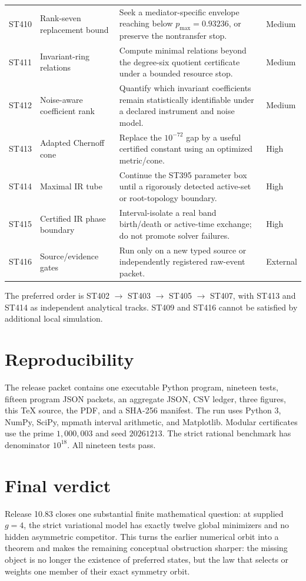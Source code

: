 \documentclass[11pt,a4paper]{article}
\begin{document}
\begin{longtable}{>{\raggedright\arraybackslash}p{}>{\raggedright\arraybackslash}p{}>{\raggedright\arraybackslash}p{}>{\raggedright\arraybackslash}p{}}
ST410&Rank-seven replacement bound&Seek a mediator-specific envelope reaching below $p_{\max}=0.93236$, or preserve the nontransfer stop.&Medium\\
ST411&Invariant-ring relations&Compute minimal relations beyond the degree-six quotient certificate under a bounded resource stop.&Medium\\
ST412&Noise-aware coefficient rank&Quantify which invariant coefficients remain statistically identifiable under a declared instrument and noise model.&Medium\\
ST413&Adapted Chernoff cone&Replace the $10^{-72}$ gap by a useful certified constant using an optimized metric/cone.&High\\
ST414&Maximal IR tube&Continue the ST395 parameter box until a rigorously detected active-set or root-topology boundary.&High\\
ST415&Certified IR phase boundary&Interval-isolate a real band birth/death or active-time exchange; do not promote solver failures.&High\\
ST416&Source/evidence gates&Run only on a new typed source or independently registered raw-event packet.&External\\
\bottomrule
\end{longtable}

The preferred order is ST402 $\to$ ST403 $\to$ ST405 $\to$ ST407, with ST413
and ST414 as independent analytical tracks.  ST409 and ST416 cannot be satisfied by
additional local simulation.

\section{Reproducibility}

The release packet contains one executable Python program, nineteen tests, fifteen
program JSON packets, an aggregate JSON, CSV ledger, three figures, this TeX source,
the PDF, and a SHA-256 manifest.  The run uses Python 3, NumPy, SciPy, mpmath interval
arithmetic, and Matplotlib.  Modular certificates use the prime $1{,}000{,}003$ and
seed $20261213$.  The strict rational benchmark has denominator $10^{18}$.  All
nineteen tests pass.

\section{Final verdict}

Release 10.83 closes one substantial finite mathematical question: at supplied
$g=4$, the strict variational model has exactly twelve global minimizers and no hidden
asymmetric competitor.  This turns the earlier numerical orbit into a theorem and
makes the remaining conceptual obstruction sharper: the missing object is no longer
the existence of preferred states, but the law that selects or weights one member of
their exact symmetry orbit.
\end{document}
